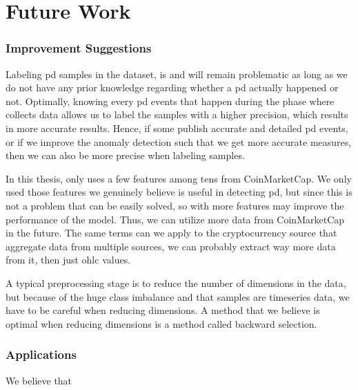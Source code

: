 \section{Future Work}

\subsubsection{Improvement Suggestions}
Labeling \ac{pd} samples in the dataset, is and will remain problematic as long as we do not have any prior knowledge regarding whether a \ac{pd} actually happened or not. Optimally, knowing every \ac{pd} events that happen during the phase where \project collects data allows us to label the samples with a higher precision, which results in more accurate results. Hence, if some publish accurate and detailed \ac{pd} events, or if we improve the anomaly detection such that we get more accurate measures, then we can also be more precise when labeling samples.

In this thesis, \project only uses a few features among tens from CoinMarketCap. We only used those features we genuinely believe is useful in detecting \ac{pd}, but since this is not a problem that can be easily solved, so with more features may improve the performance of the model. Thus, we can utilize more data from CoinMarketCap in the future. The same terms can we apply to the cryptocurrency source that aggregate data from multiple sources, we can probably extract way more data from it, then just \ac{ohlc} values.

A typical preprocessing stage is to reduce the number of dimensions in the data, but because of the huge class imbalance and that samples are timeseries data, we have to be careful when reducing dimensions. A method that we believe is optimal when reducing dimensions is a method called backward selection.

\subsubsection{Applications}
We believe that

